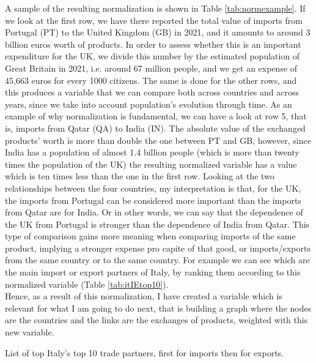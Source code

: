 A sample of the resulting normalization is shown in Table \ref{tab:normexample}. If we look at the first row, we have there reported the total value of imports from Portugal (PT) to the United Kingdom (GB) in 2021, and it amounts to around 3 billion euros worth of products. In order to assess whether this is an important expenditure for the UK, we divide this number by the estimated population of Great Britain in 2021, i.e. around 67 million people, and we get an expense of 45,663 euros for every 1000 citizens. The same is done for the other rows, and this produces a variable that we can compare both across countries and across years, since we take into account population's evolution through time. As an example of why normalization is fundamental, we can have a look at row 5, that is, imports from Qatar (QA) to India (IN). The absolute value of the exchanged products' worth is more than double the one between PT and GB, however, since India has a population of almost 1.4 billion people (which is more than twenty times the population of the UK) the resulting normalized variable has a value which is ten times less than the one in the first row. Looking at the two relationships between the four countries, my interpretation is that, for the UK, the imports from Portugal can be considered more important than the imports from Qatar are for India. Or in other words, we can say that the dependence of the UK from Portugal is stronger than the dependence of India from Qatar. This type of comparison gains more meaning when comparing imports of the same product, implying a stronger expense pro capite of that good, or imports/exports from the same country or to the same country. For example we can see which are the main import or export partners of Italy, by ranking them according to this normalized variable (Table \ref{tab:itIEtop10}).\\
Hence, as a result of this normalization, I have created a variable which is relevant for what I am going to do next, that is building a graph where the nodes are the countries and the links are the exchanges of products, weighted with this new variable.

\begin{table}
    \centering
    \resizebox{1.0\textwidth}{!}{
    
    }
    \caption[List of top Italy's top 10 trade partners.]{List of top Italy's top 10 trade partners, first for imports then for exports.}
    \label{tab:itIEtop10}
\end{table}



